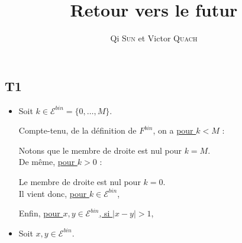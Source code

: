 \documentclass[a4paper,11pt]{article}
\title{Retour vers le futur}
\author{Qi \textsc{Sun} et Victor \textsc{Quach}}
\date{}
\def \E{\mathcal{E}}
\begin{document}
\maketitle


\subsection*{T1}

\begin{itemize}
\item[\textbullet]
Soit $k \in \E^{bin}=\{0, \dots, M\}$. 

Compte-tenu, de la définition de $F^{bin}$, on a \underline{pour $k<M$} :


\begin{center}
\end{center}

Notons que le membre de droite est nul pour $k=M$.\\


De même, \underline{pour $k>0$} : 
\begin{center}
\end{center}
Le membre de droite est nul pour $k=0$.\\


Il vient donc, \underline{pour $k \in \E^{bin}$},
\begin{center}
\end{center}

\vspace{5mm}
Enfin, \underline{pour $x,y \in \E^{bin}$, si $|x-y|>1$},
\begin{center}
\end{center}
\vspace{5mm}



\item[\textbullet]
Soit $x,y \in \E^{bin}$.


\end{itemize}
\end{document}
